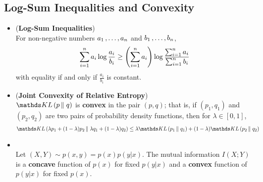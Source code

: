 \documentclass[11pt]{article}
\begin{document}
\subsection{Log-Sum Inequalities and Convexity}
\begin{itemize}
\item \begin{proposition} (\textbf{Log-Sum Inequalities}) \citep{thomas2006elements}\\
For non-negative numbers $a_1 \,{,}\ldots{,}\, a_n$ and $b_1 \,{,}\ldots{,}\, b_n$,
\begin{align}
\sum_{i=1}^{n}a_i \log\frac{a_i}{b_i} \ge \left(\sum_{i=1}^{n}a_i\right) \log\frac{\sum_{i=1}^{n}a_i}{\sum_{i=1}^{n}b_i} \label{ineqn: log_sum_inequality}
\end{align} with equality if and only if $\frac{a_i}{b_i}$ is constant.
\end{proposition}

\item \begin{proposition} (\textbf{Joint Convexity of Relative Entropy}) \citep{thomas2006elements}\\
$\kl{p}{q}$ is \textbf{convex} in the pair $(p, q)$; that is, if $(p_1, q_1)$ and $(p_2, q_2)$ are two pairs of probability density functions, then for $\lambda \in [0, 1]$,  
\begin{align}
\kl{\lambda p_1 + (1- \lambda) p_2}{\lambda q_1 + (1- \lambda) q_2} &\le \lambda \kl{p_1}{q_1} + (1- \lambda) \kl{p_2}{q_2} \label{ineqn: kl_divergence_joint_convex}
\end{align}
\end{proposition}

\item \begin{proposition} \citep{thomas2006elements}\\
Let $(X,Y) \sim p(x,y) = p(x)p(y|x)$. The mutual information $I(X; Y)$ is a \textbf{concave} function of $p(x)$ for fixed $p(y|x)$ and a \textbf{convex} function of $p(y|x)$ for fixed $p(x)$.
\end{proposition}
\end{itemize}
\end{document}
